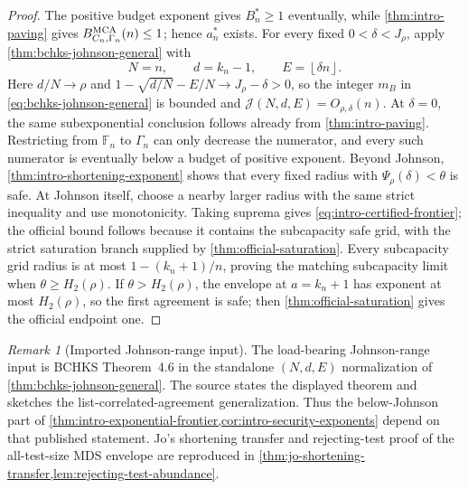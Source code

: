 \documentclass[11pt,a4paper]{amsart}
\numberwithin{equation}{section}
\theoremstyle{remark}
\newtheorem{remark}[remark]{Remark}
\newcommand{\F}{\mathbb F}
\newcommand{\Jcal}{\mathcal J}
\newcommand{\floor}[1]{\left\lfloor #1\right\rfloor}
\begin{document}
\begin{proof}
The positive budget exponent gives \(B_n^*\ge1\) eventually, while
\cref{thm:intro-paving} gives
\(B_{C_n,\Gamma_n}^{\rm MCA}(n)\le1\); hence \(a_n^*\) exists.
For every fixed \(0<\delta<J_\rho\), apply
\cref{thm:bchks-johnson-general} with
\[
 N=n,\qquad d=k_n-1,\qquad E=\floor{\delta n}.
\]
Here \(d/N\to\rho\) and
\(1-\sqrt{d/N}-E/N\to J_\rho-\delta>0\), so the integer \(m_B\) in
\eqref{eq:bchks-johnson-general} is bounded and
\(\Jcal(N,d,E)=O_{\rho,\delta}(n)\).  At \(\delta=0\), the same
subexponential conclusion
follows already from \cref{thm:intro-paving}.  Restricting from \(\F_n\)
to \(\Gamma_n\) can only decrease the numerator, and every such numerator
is eventually below a budget of positive exponent.  Beyond Johnson,
\cref{thm:intro-shortening-exponent} shows that every fixed radius with
\(\Psi_\rho(\delta)<\theta\) is safe.  At Johnson itself, choose a nearby
larger radius with the same strict inequality and use monotonicity.
Taking suprema gives \eqref{eq:intro-certified-frontier}; the official
bound follows because it contains the subcapacity safe grid, with the strict
saturation branch supplied by \cref{thm:official-saturation}.
Every subcapacity grid radius is at most \(1-(k_n+1)/n\), proving the
matching subcapacity limit when \(\theta\ge H_2(\rho)\).  If
\(\theta>H_2(\rho)\), the envelope at \(a=k_n+1\) has exponent at most
\(H_2(\rho)\), so the first agreement is safe; then
\cref{thm:official-saturation} gives the official endpoint one.
\end{proof}

\begin{remark}[Imported Johnson-range input]
\label{rem:bchks-theorem46-provenance}
The load-bearing Johnson-range input is BCHKS Theorem~4.6 in the
standalone \((N,d,E)\) normalization of
\cref{thm:bchks-johnson-general}.  The source states the displayed theorem
and sketches the list-correlated-agreement generalization.  Thus the
below-Johnson part of
\cref{thm:intro-exponential-frontier,cor:intro-security-exponents} depend on
that published statement.  Jo's shortening transfer and rejecting-test
proof of the all-test-size MDS envelope are reproduced in
\cref{thm:jo-shortening-transfer,lem:rejecting-test-abundance}.
\end{remark}
\end{document}
